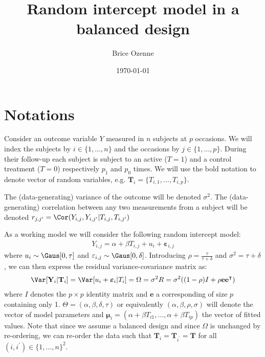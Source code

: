 \documentclass[12pt]{article}
\author{Brice Ozenne}
\date{\today}
\title{Random intercept model in a balanced design}
\newcommand\Ve{\mathbf{e}}
\newcommand\VT{\mathbf{T}}
\newcommand\VY{\mathbf{Y}}
\newcommand\Vvarepsilon{\boldsymbol{\varepsilon}}
\newcommand\Vmu{\boldsymbol{\mu}}
\newcommand\trans[1]{{#1}^\intercal}%
\begin{document}
\maketitle


\section{Notations}
\label{sec:org0eb866b}

Consider an outcome variable \(Y\) measured in \(n\) subjects at \(p\)
occasions. We will index the subjects by \(i \in \{1,\ldots,n\}\) and
the occasions by \(j \in \{1,\ldots,p\}\). During their follow-up each
subject is subject to an active (\(T=1\)) and a control treatment
(\(T=0\)) respectively \(p_1\) and \(p_0\) times. We will use the bold
notation to denote vector of random variables, e.g.
\(\VT_i=\{T_{i,1},\ldots,T_{i,p}\}\).

\bigskip

The (data-generating) variance of the outcome will be denoted
\(\sigma^2\). The (data-generating) correlation between any two
measurements from a subject will be denoted \(r_{j,j^{\prime}} = \Cor(Y_{i,j},Y_{i,j^{\prime}}|T_{i,j},T_{i,j^{\prime}})\)

\bigskip

As a working model we will consider the following random intercept
model:
\begin{align*}
Y_{i,j} = \alpha + \beta T_{i,j} + u_i + \Vvarepsilon_{i,j}
\end{align*}
where \(u_i \sim \Gaus[0,\tau]\) and \(\varepsilon_{i,j} \sim
\Gaus[0,\delta]\). Introducing \(\rho = \frac{\tau}{\tau+\delta}\) and
\(\sigma^2=\tau+\delta\), we can then express the residual
variance-covariance matrix as:
\begin{align*}
\Var[\VY_{i}|\VT_i] = \Var[u_{i} + \Vvarepsilon_{i}|T_i] = \Omega = \sigma^2 R = \sigma^2 ((1-\rho) I + \rho \Ve\trans{\Ve})
\end{align*}
where \(I\) denotes the \(p \times p\) identity matrix and \(\Ve\) a
corresponding of size \(p\) containing only 1. \(\Theta =
(\alpha,\beta,\delta,\tau)\) or equivalently
\((\alpha,\beta,\rho,\sigma)\) will denote the vector of model
parameters and \(\Vmu_{i}=\left(\alpha+\beta
T_{i1},\ldots,\alpha+\beta T_{ip}\right)\) the vector of fitted
values. Note that since we assume a balanced design and since
\(\Omega\) is unchanged by re-ordering, we can re-order the data such
that \(\VT_i=\VT_{i^{\prime}}=\VT\) for all \((i,i^{\prime})\in\{1,\ldots,n\}^2\).
\end{document}
